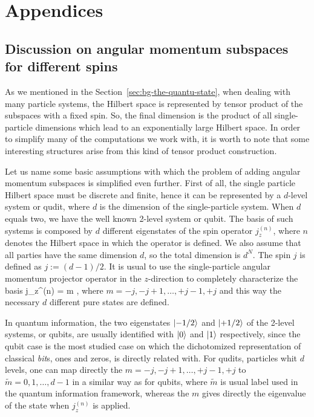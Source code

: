 \renewcommand\thesubsection{\Alph{subsection}}
\section*{Appendices}

\subsection{Discussion on angular momentum subspaces for different spins}
\label{app:angular-subspaces}

As we mentioned in the Section~\ref{sec:bg-the-quantu-state}, when dealing with many particle systems, the Hilbert space is represented by tensor product of the subspaces with a fixed spin.
So, the final dimension is the product of all single-particle dimensions which lead to an exponentially large Hilbert space.
In order to simplify many of the computations we work with, it is worth to note that some interesting structures arise from this kind of tensor product construction.

Let us name some basic assumptions with which the problem of adding angular momentum subspaces is simplified even further.
First of all, the single particle Hilbert space must be discrete and finite, hence it can be represented by a $d$-level system or qudit, where $d$ is the dimension of the single-particle system.
When $d$ equals two, we have the well known 2-level system or qubit.
The basis of such systems is composed by $d$ different eigenstates of the spin operator $j_z^{(n)}$, where $n$ denotes the Hilbert space in which the operator is defined.
We also assume that all parties have the same dimension $d$, so the total dimension is $d^N$.
The spin $j$ is defined as $j:=(d-1)/2$.
It is usual to use the single-particle angular momentum projector operator in the $z$-direction to completely characterize the basis
\be
  j_z^{(n)} = m ,
\ee
where $m = -j,-j+1,\dots,+j-1,+j$ and this way the necessary $d$ different pure states are defined.

In quantum information, the two eigenstates $\vert{-1/2}\rangle$ and $\vert{+1/2}\rangle$ of the 2-level systems, or qubits, are usually identified with $\vert{0}\rangle$ and $\vert{1}\rangle$ respectively, since the qubit case is the most studied case on which the dichotomized representation of classical \emph{bit}s, ones and zeros, is directly related with.
For qudits, particles whit $d$ levels, one can map directly the $m=-j,-j+1,\dots,+j-1,+j$ to $\tilde{m}=0,1,\dots,d-1$ in a similar way as for qubits, where $\tilde{m}$ is usual label used in the quantum information framework, whereas the $m$ gives directly the eigenvalue of the state when $j_z^{(n)}$ is applied.

